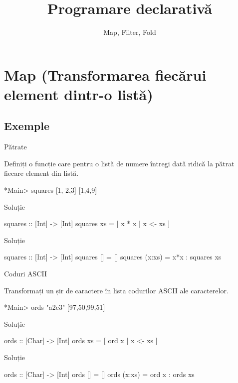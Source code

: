 \documentclass[xcolor=pdftex,romanian,colorlinks]{beamer}
\title[PD---Funcții de ordin înalt]{Programare declarativă}
\subtitle{Map, Filter, Fold}
\begin{document}
\begin{frame}
  \titlepage
\end{frame}

\section{Map (Transformarea fiecărui element dintr-o listă)}

\subsection{Exemple}

\begin{frame}[fragile]{Pătrate}
\begin{block}{}
Definiți o funcție care pentru o listă de numere întregi dată  ridică la pătrat fiecare element din listă.
\begin{asciihs}
*Main> squares [1,-2,3]
[1,4,9]
\end{asciihs}
\end{block}
\begin{block}{Soluție }
\begin{asciihs}
squares :: [Int] -> [Int]
squares xs = [ x * x | x <- xs ]
\end{asciihs}
\end{block}
\begin{block}{Soluție }
\begin{asciihs}
squares :: [Int] -> [Int]
squares []     = []
squares (x:xs) = x*x : squares xs
\end{asciihs}
\end{block}
\end{frame}

\begin{frame}[fragile]
{Coduri ASCII}
\begin{block}{}
Transformați un șir de caractere în lista codurilor ASCII ale caracterelor.
\begin{asciihs}
*Main> ords "a2c3"
[97,50,99,51]
\end{asciihs}
\end{block}
\begin{block}{Soluție }
\begin{asciihs}
ords :: [Char] -> [Int]
ords xs = [ ord x | x <- xs ]
\end{asciihs}
\end{block}
\begin{block}{Soluție }
\begin{asciihs}
ords :: [Char] -> [Int]
ords []     = []
ords (x:xs) = ord x : ords xs
\end{asciihs}
\end{block}
\end{frame}
\end{document}
